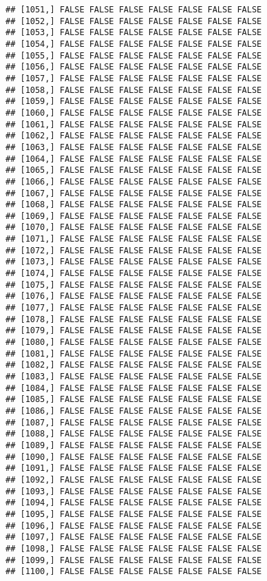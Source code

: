 \documentclass[
]{article}
\begin{document}
\begin{verbatim}
## [1051,] FALSE FALSE FALSE FALSE FALSE FALSE FALSE
## [1052,] FALSE FALSE FALSE FALSE FALSE FALSE FALSE
## [1053,] FALSE FALSE FALSE FALSE FALSE FALSE FALSE
## [1054,] FALSE FALSE FALSE FALSE FALSE FALSE FALSE
## [1055,] FALSE FALSE FALSE FALSE FALSE FALSE FALSE
## [1056,] FALSE FALSE FALSE FALSE FALSE FALSE FALSE
## [1057,] FALSE FALSE FALSE FALSE FALSE FALSE FALSE
## [1058,] FALSE FALSE FALSE FALSE FALSE FALSE FALSE
## [1059,] FALSE FALSE FALSE FALSE FALSE FALSE FALSE
## [1060,] FALSE FALSE FALSE FALSE FALSE FALSE FALSE
## [1061,] FALSE FALSE FALSE FALSE FALSE FALSE FALSE
## [1062,] FALSE FALSE FALSE FALSE FALSE FALSE FALSE
## [1063,] FALSE FALSE FALSE FALSE FALSE FALSE FALSE
## [1064,] FALSE FALSE FALSE FALSE FALSE FALSE FALSE
## [1065,] FALSE FALSE FALSE FALSE FALSE FALSE FALSE
## [1066,] FALSE FALSE FALSE FALSE FALSE FALSE FALSE
## [1067,] FALSE FALSE FALSE FALSE FALSE FALSE FALSE
## [1068,] FALSE FALSE FALSE FALSE FALSE FALSE FALSE
## [1069,] FALSE FALSE FALSE FALSE FALSE FALSE FALSE
## [1070,] FALSE FALSE FALSE FALSE FALSE FALSE FALSE
## [1071,] FALSE FALSE FALSE FALSE FALSE FALSE FALSE
## [1072,] FALSE FALSE FALSE FALSE FALSE FALSE FALSE
## [1073,] FALSE FALSE FALSE FALSE FALSE FALSE FALSE
## [1074,] FALSE FALSE FALSE FALSE FALSE FALSE FALSE
## [1075,] FALSE FALSE FALSE FALSE FALSE FALSE FALSE
## [1076,] FALSE FALSE FALSE FALSE FALSE FALSE FALSE
## [1077,] FALSE FALSE FALSE FALSE FALSE FALSE FALSE
## [1078,] FALSE FALSE FALSE FALSE FALSE FALSE FALSE
## [1079,] FALSE FALSE FALSE FALSE FALSE FALSE FALSE
## [1080,] FALSE FALSE FALSE FALSE FALSE FALSE FALSE
## [1081,] FALSE FALSE FALSE FALSE FALSE FALSE FALSE
## [1082,] FALSE FALSE FALSE FALSE FALSE FALSE FALSE
## [1083,] FALSE FALSE FALSE FALSE FALSE FALSE FALSE
## [1084,] FALSE FALSE FALSE FALSE FALSE FALSE FALSE
## [1085,] FALSE FALSE FALSE FALSE FALSE FALSE FALSE
## [1086,] FALSE FALSE FALSE FALSE FALSE FALSE FALSE
## [1087,] FALSE FALSE FALSE FALSE FALSE FALSE FALSE
## [1088,] FALSE FALSE FALSE FALSE FALSE FALSE FALSE
## [1089,] FALSE FALSE FALSE FALSE FALSE FALSE FALSE
## [1090,] FALSE FALSE FALSE FALSE FALSE FALSE FALSE
## [1091,] FALSE FALSE FALSE FALSE FALSE FALSE FALSE
## [1092,] FALSE FALSE FALSE FALSE FALSE FALSE FALSE
## [1093,] FALSE FALSE FALSE FALSE FALSE FALSE FALSE
## [1094,] FALSE FALSE FALSE FALSE FALSE FALSE FALSE
## [1095,] FALSE FALSE FALSE FALSE FALSE FALSE FALSE
## [1096,] FALSE FALSE FALSE FALSE FALSE FALSE FALSE
## [1097,] FALSE FALSE FALSE FALSE FALSE FALSE FALSE
## [1098,] FALSE FALSE FALSE FALSE FALSE FALSE FALSE
## [1099,] FALSE FALSE FALSE FALSE FALSE FALSE FALSE
## [1100,] FALSE FALSE FALSE FALSE FALSE FALSE FALSE

\end{verbatim}
\end{document}
